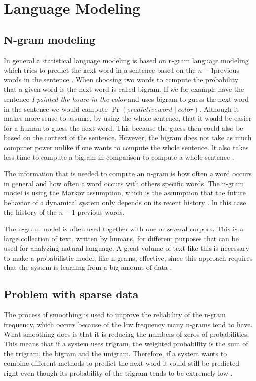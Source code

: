 \documentclass[a4paper,12pt]{article}
\begin{document}
\section{Language Modeling}
\subsection{N-gram modeling}
\label{sec:ngram}
In general a statistical language modeling is based on n-gram language modeling which tries to predict the next word in a sentence based on the $n-1$previous words in the sentence \cite{gallagher2004natural}.  When choosing two words to compute the probability that a given word is the next word is called bigram. If we for example have the sentence \emph{I painted the house in the color} and uses bigram to guess the next word in the sentence we would compute $\Pr(predictive word \mid color)$. Although it makes more sense to assume, by using the whole sentence, that it would be easier for a human to guess the next word. This because the guess then could also be based on the context of the sentence. However, the bigram does not take as much computer power unlike if one wants to compute the whole sentence. It also takes less time to compute a bigram in comparison to compute a whole sentence \cite{gallagher2004natural}.

The information that is needed to compute an n-gram is how often a word occurs in general and how often a word occurs with others specific words. The n-gram model is using the Markov assumption, which is the assumption that the future behavior of a dynamical system only depends on its recent history \cite{mooneynatural}. In this case the history of the $n-1$ previous words. 

The n-gram model is often used together with one or several corpora. This is a large collection of text, written by humans, for different purposes that can be used for analyzing natural language. A great volume of text like this is necessary to make a probabilistic model, like n-grams, effective, since this approach requires that the system is learning from a big amount of data \cite{russell2010ai}.

\subsection{Problem with sparse data}
The process of smoothing is used to improve the reliability of the n-gram frequency, which occurs because of the low frequency many n-grams tend to have. What smoothing does is that it is reducing the numbers of zeros of probabilities. This means that if a system uses trigram, the weighted probability is the sum of the trigram, the bigram and the unigram. Therefore, if a system wants to combine different methods to predict the next word it could still be predicted right even though its probability of the trigram tends to be extremely low \cite{smoothing}.
\end{document}
